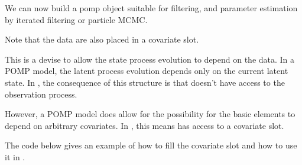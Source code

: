 \documentclass{beamer}
\begin{document}
\begin{frame}[fragile]

\bi

\item We can now build a pomp object suitable for filtering, and parameter estimation by iterated filtering or particle MCMC. 

\item Note that the data are also placed in a covariate slot. 

\item This is a devise to allow the state process evolution to depend on the data. In a POMP model, the latent process evolution depends only on the current latent state. In , the consequence of this structure is that  doesn't have access to the observation process. 

\item However, a POMP model does allow for the possibility for the basic elements to depend on arbitrary covariates. In , this means  has access to a covariate slot.

\item The code below gives an example of how to fill the covariate slot and how to use it in .


\ei

\end{frame}

\begin{frame}[fragile]

\begin{knitrout}\small
{}\color{fgcolor}\begin{kframe}
\begin{alltt}
 \hlkwb{<-} \hlstd{(}\hlstd{=}\hlstd{(}
    \hlstd{=}\hlopt{:}
  \hlstd{=}\hlstd{,}
  \hlstd{=}\hlstd{,}
  \hlstd{=}\hlstd{(}
    \hlstd{=}\hlopt{:}
    \hlstd{=}\hlstd{(}
    \hlstd{=}\hlstd{),}
  \hlstd{=}
  \hlstd{=}
  \hlstd{=}\hlstd{(}\hlstd{=}\hlstd{=}\hlstd{),}
  \hlstd{=}
\hlstd{)}
\end{alltt}
\end{kframe}
\end{knitrout}

\end{frame}
\end{document}
